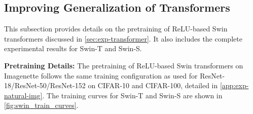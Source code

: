 \begin{table*}[h]
    \begin{subtable}[t]{\textwidth}
        \centering
        \caption{\small \textbf{ResNet-152.} Avg rel improve: 498.41\%. Avg $\beta$: 0.98.}
        \label{tab:rob-ResNet-152-full}
    \end{subtable}
\vskip -0.1in
\end{table*}


\subsection{Improving Generalization of Transformers}\label{app:exp-transformer}
This subsection provides details on the pretraining of ReLU-based Swin transformers discussed in \cref{sec:exp-transformer}. It also includes the complete experimental results for Swin-T and Swin-S.

\textbf{Pretraining Details:} The pretraining of ReLU-based Swin transformers on Imagenette follows the same training configuration as used for ResNet-18/ResNet-50/ResNet-152 on CIFAR-10 and CIFAR-100, detailed in \cref{app:exp-natural-img}. The training curves for Swin-T and Swin-S are shown in \cref{fig:swin_train_curves}.

